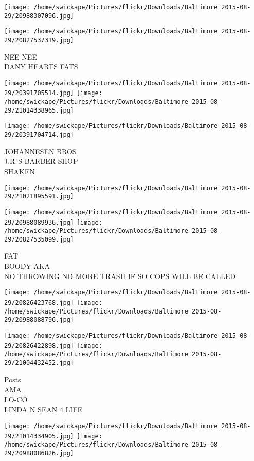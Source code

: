 \documentclass[10pt,letterpaper]{article}
\begin{document}
\texttt{[image: /home/swickape/Pictures/flickr/Downloads/Baltimore 2015-08-29/20988307096.jpg]}

\vspace{0.25in}
\texttt{[image: /home/swickape/Pictures/flickr/Downloads/Baltimore 2015-08-29/20827537319.jpg]}

NEE{-}NEE\\
DANY HEARTS FATS
\pagebreak

\texttt{[image: /home/swickape/Pictures/flickr/Downloads/Baltimore 2015-08-29/20391705514.jpg]}
\texttt{[image: /home/swickape/Pictures/flickr/Downloads/Baltimore 2015-08-29/21014338965.jpg]}

\texttt{[image: /home/swickape/Pictures/flickr/Downloads/Baltimore 2015-08-29/20391704714.jpg]}

JOHANNESEN BROS\\
J.R.'S BARBER SHOP\\
SHAKEN
\pagebreak

\texttt{[image: /home/swickape/Pictures/flickr/Downloads/Baltimore 2015-08-29/21021895591.jpg]}

\vspace{0.25in}
\texttt{[image: /home/swickape/Pictures/flickr/Downloads/Baltimore 2015-08-29/20988089936.jpg]}
\texttt{[image: /home/swickape/Pictures/flickr/Downloads/Baltimore 2015-08-29/20827535099.jpg]}

FAT\\
BOODY AKA\\
NO THROWING NO MORE TRASH IF SO COPS WILL BE CALLED
\pagebreak

\texttt{[image: /home/swickape/Pictures/flickr/Downloads/Baltimore 2015-08-29/20826423768.jpg]}
\texttt{[image: /home/swickape/Pictures/flickr/Downloads/Baltimore 2015-08-29/20988088796.jpg]}

\texttt{[image: /home/swickape/Pictures/flickr/Downloads/Baltimore 2015-08-29/20826422898.jpg]}
\texttt{[image: /home/swickape/Pictures/flickr/Downloads/Baltimore 2015-08-29/21004432452.jpg]}

Posts\\
AMA\\
LO{-}CO\\
LINDA N SEAN 4 LIFE
\pagebreak

\texttt{[image: /home/swickape/Pictures/flickr/Downloads/Baltimore 2015-08-29/21014334905.jpg]}
\texttt{[image: /home/swickape/Pictures/flickr/Downloads/Baltimore 2015-08-29/20988086826.jpg]}
\end{document}
